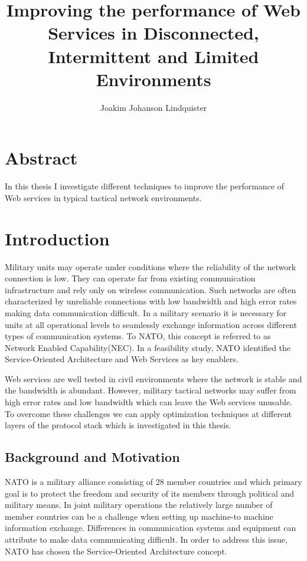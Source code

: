 \documentclass[USenglish]{ifimaster}
\title{Improving the performance of Web Services in Disconnected, Intermittent and Limited Environments}
\author{Joakim Johanson Lindquister}
\begin{document}
\ififorside{}

\chapter*{Abstract}
In this thesis I investigate different techniques to improve the performance of Web services in typical tactical network environments.
\pagebreak

\tableofcontents
\listoftables
\listoffigures

\pagebreak


\chapter{Introduction}
Military units may operate under conditions where the reliability of the network
connection is low. They can operate far from existing communication
infrastructure and rely only on wireless communication. Such networks are often
characterized by unreliable connections with low bandwidth and high error rates
making data communication difficult. In a military scenario it is necessary for
units at all operational levels to seamlessly exchange information across
different types of communication systems. To NATO, this concept is referred to
as Network Enabled Capability(NEC). In a feasibility study, NATO identified the
Service-Oriented Architecture and Web Services as key enablers\cite{nnec-study}.

Web services are well tested in civil environments where the network is stable
and the bandwidth is abundant. However, military tactical networks may suffer
from high error rates and low bandwidth which can leave the Web services
unusable. To overcome these challenges we can apply optimization techniques at
different layers of the protocol stack which is investigated in this thesis.

\section{Background and Motivation}
NATO is a military alliance consisting of 28 member
countries\cite{nato-homepage-member-countries} and which primary goal is to
protect the freedom and security of its members through political and military
means. In joint military operations the relatively large number of member
countries can be a challenge when setting up machine-to machine information
exchange. Differences in communication systems and equipment can attribute to
make data communicating difficult. In order to address this issue, NATO has
chosen the Service-Oriented Architecture concept.
\end{document}
